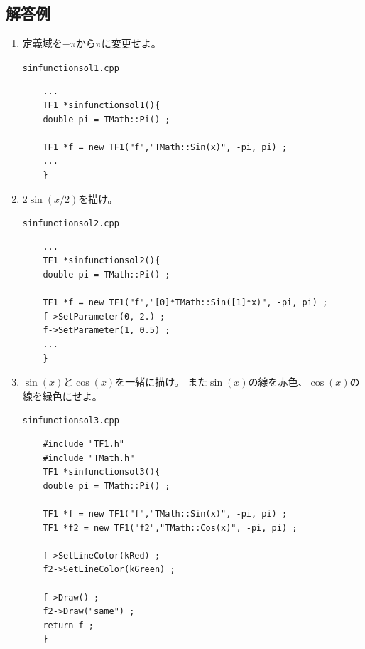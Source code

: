 \documentclass{jarticle}
\begin{document}
  \subsection{解答例}
  \begin{enumerate}
   \item 定義域を$ -\pi $から$ \pi $に変更せよ。
	 \begin{itembox}{\texttt{sinfunctionsol1.cpp}}
\begin{verbatim}
	...
	TF1 *sinfunctionsol1(){
	double pi = TMath::Pi() ;

	TF1 *f = new TF1("f","TMath::Sin(x)", -pi, pi) ;
	...
	}
\end{verbatim}
	 \end{itembox}

   \item $2\sin(x/2)$を描け。
	 \begin{itembox}{\texttt{sinfunctionsol2.cpp}}
\begin{verbatim}
	...
	TF1 *sinfunctionsol2(){
	double pi = TMath::Pi() ;

	TF1 *f = new TF1("f","[0]*TMath::Sin([1]*x)", -pi, pi) ;
	f->SetParameter(0, 2.) ;
	f->SetParameter(1, 0.5) ;
	...
	}
\end{verbatim}
	 \end{itembox}

   \item $\sin(x)$と$\cos(x)$を一緒に描け。
	 また$\sin(x)$の線を赤色、$\cos(x)$の線を緑色にせよ。
	 \begin{itembox}{\texttt{sinfunctionsol3.cpp}}
\begin{verbatim}
	#include "TF1.h"
	#include "TMath.h"
	TF1 *sinfunctionsol3(){
	double pi = TMath::Pi() ;

	TF1 *f = new TF1("f","TMath::Sin(x)", -pi, pi) ;
	TF1 *f2 = new TF1("f2","TMath::Cos(x)", -pi, pi) ;

	f->SetLineColor(kRed) ;
	f2->SetLineColor(kGreen) ;

	f->Draw() ;
	f2->Draw("same") ;
	return f ;
	}
\end{verbatim}
	 \end{itembox}

  \end{enumerate}




  \clearpage
\end{document}
